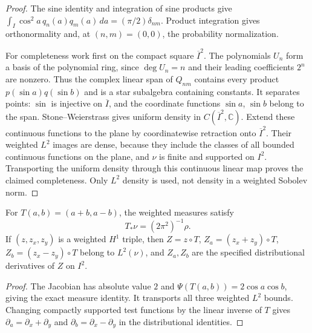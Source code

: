 \begin{proof}
\leanok
The sine identity and integration of sine products give
$\int_I\cos^2a\,q_n(a)q_m(a)\,da=(\pi/2)\delta_{nm}$.
Product integration gives orthonormality and, at $(n,m)=(0,0)$,
the probability normalization.

For completeness work first on the compact square $\overline I^2$.
The polynomials $U_n$ form a basis of the polynomial ring, since
$\deg U_n=n$ and their leading coefficients $2^n$ are nonzero.
Thus the complex linear span of $Q_{nm}$ contains every product
$p(\sin a)q(\sin b)$ and is a star subalgebra containing constants.
It separates points: $\sin$ is injective on $\overline I$, and
the coordinate functions $\sin a$, $\sin b$ belong to the span.
Stone--Weierstrass gives uniform density in $C(\overline I^2,\mathbb C)$.
Extend these continuous functions to the plane by coordinatewise retraction
onto $\overline I^2$. Their weighted $L^2$ images are dense, because they
include the classes of all bounded continuous functions on the plane,
and $\nu$ is finite and supported on $I^2$.
Transporting the uniform density through this continuous linear map proves
the claimed completeness. Only $L^2$ density is used, not density in a
weighted Sobolev norm.
\end{proof}

\begin{lemma}
\label{lem:zonal-diagonal-domain}
\leanok
For $T(a,b)=(a+b,a-b)$, the weighted measures satisfy
\[
 T_*\nu=(2\pi^2)^{-1}\rho.
\]
If $(z,z_x,z_y)$ is a weighted $H^1$ triple, then
$Z=z\circ T$, $Z_a=(z_x+z_y)\circ T$, $Z_b=(z_x-z_y)\circ T$
belong to $L^2(\nu)$, and $Z_a,Z_b$ are the specified distributional
derivatives of $Z$ on $I^2$.
\end{lemma}

\begin{proof}
\leanok
The Jacobian has absolute value $2$ and
$\Psi(T(a,b))=2\cos a\cos b$, giving the exact measure identity.
It transports all three weighted $L^2$ bounds.
Changing compactly supported test functions by the linear inverse of $T$
gives $\partial_a=\partial_x+\partial_y$ and
$\partial_b=\partial_x-\partial_y$ in the distributional identities.
\end{proof}

